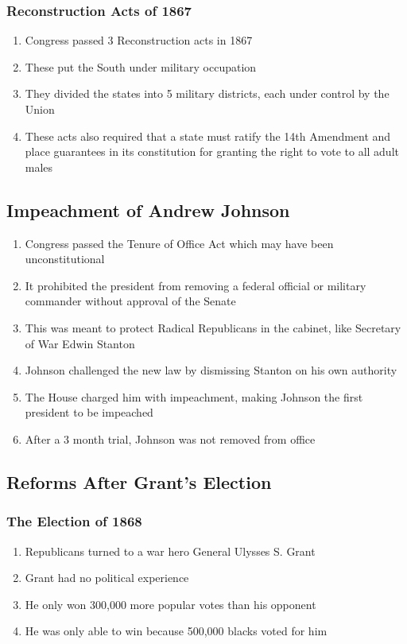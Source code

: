 \documentclass[12pt]{article} %
\begin{document}
\subsubsection{Reconstruction Acts of 1867}
\begin{enumerate}
	\item Congress passed 3 Reconstruction acts in 1867 
	\item These put the South under military occupation
	\item They divided the states into 5 military districts, each under control by the Union
	\item These acts also required that a state must ratify the 14th Amendment and place guarantees
		in its constitution for granting the right to vote to all adult males
\end{enumerate}

\subsection{Impeachment of Andrew Johnson}
\begin{enumerate}
	\item Congress passed the Tenure of Office Act which may have been unconstitutional
	\item It prohibited the president from removing a federal official or military commander without
		approval of the Senate
	\item This was meant to protect Radical Republicans in the cabinet, like Secretary of War Edwin
		Stanton
	\item Johnson challenged the new law by dismissing Stanton on his own authority
	\item The House charged him with impeachment, making Johnson the first president to be impeached
	\item After a 3 month trial, Johnson was not removed from office
\end{enumerate}

\subsection{Reforms After Grant's Election}

\subsubsection{The Election of 1868}
\begin{enumerate}
	\item Republicans turned to a war hero General Ulysses S. Grant
	\item Grant had no political experience
	\item He only won 300,000 more popular votes than his opponent 
	\item He was only able to win because 500,000 blacks voted for him
\end{enumerate}
\end{document}
